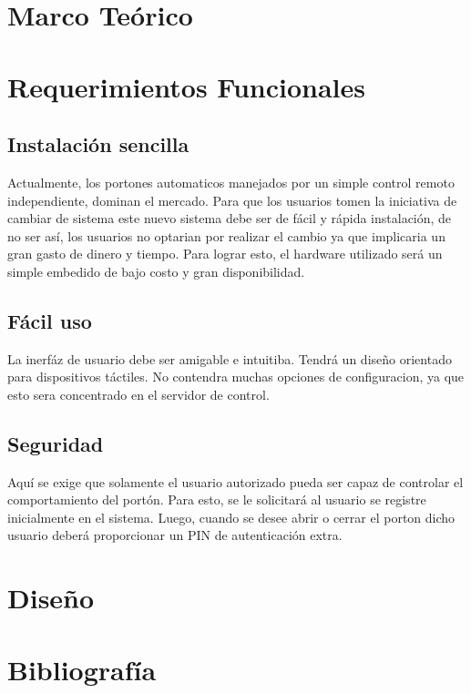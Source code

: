 \documentclass[16pt, article,notitlepage]{article}
\begin{document}
\section{Marco Teórico}
\section{Requerimientos Funcionales}
\subsection{Instalación sencilla}
Actualmente, los portones automaticos manejados por un simple control remoto independiente, dominan el mercado. Para que los usuarios tomen la iniciativa de cambiar de sistema este nuevo sistema debe ser de fácil y rápida instalación, de no ser así, los usuarios no optarian por realizar el cambio ya que implicaria un gran gasto de dinero y tiempo.
Para lograr esto, el hardware utilizado será un simple embedido de bajo costo y gran disponibilidad. 
\subsection{Fácil uso}
La inerfáz de usuario debe ser amigable e intuitiba. Tendrá un diseño orientado para dispositivos táctiles. No contendra muchas opciones de configuracion, ya que esto sera concentrado en el servidor de control.
\subsection{Seguridad}
Aquí se exige que solamente el usuario autorizado pueda ser capaz de controlar el comportamiento del portón. Para esto, se le solicitará al usuario se registre inicialmente en el sistema. Luego, cuando se desee abrir o cerrar el porton dicho usuario deberá proporcionar un PIN de autenticación extra.
\section{Diseño}
\section{Bibliografía}



\end{document}
